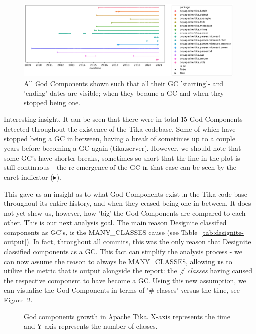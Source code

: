 \documentclass{article}
\begin{document}
\begin{figure}[H]
    \centering
    \includegraphics[width=\textwidth]{report/images/gc_lineplot.png}
    \caption{All God Components shown such that all their GC 'starting'- and 'ending' dates are visible; when they became a GC and when they stopped being one.}
    \label{fig:gc_lineplot}
\end{figure}

Interesting insight. It can be seen that there were in total 15 God Components detected throughout the existence of the Tika codebase. Some of which have stopped being a GC in between, having a break of sometimes up to a couple years before becoming a GC again (tika.server). However, we should note that some GC's have shorter breaks, sometimes so short that the line in the plot is still continuous - the re-emergence of the GC in that case can be seen by the caret indicator ($\blacktriangleright$).

This gave us an insight as to what God Components exist in the Tika code-base throughout its entire history, and when they ceased being one in between. It does not yet show us, however, how 'big' the God Components are compared to each other. This is our next analysis goal. The main reason Designite classified components as GC's, is the MANY\_CLASSES cause (see Table~\ref{tab:designite-output}). In fact, throughout all commits, this was the only reason that Designite classified components as a GC. This fact can simplify the analysis process - we can now assume the reason to always be MANY\_CLASSES, allowing us to utilize the metric that is output alongside the report: the \textit{\# classes} having caused the respective component to have become a GC. Using this new assumption, we can visualize the God Components in terms of '\# classes' versus the time, see Figure~\ref{fig:class_growth}.

\begin{figure}[H]
    \centering
    
    \caption{God components growth in Apache Tika. X-axis represents the time and Y-axis represents the number of classes.}
    \label{fig:class_growth}
\end{figure}
\end{document}
